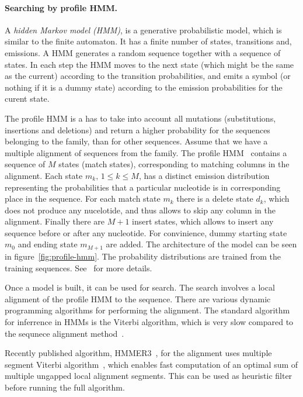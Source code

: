 \paragraph{Searching by profile HMM.}
A \emph{hidden Markov model (HMM)}, is a generative probabilistic model, which is similar to the finite automaton. It has a finite number of states, transitions and, emissions. A HMM generates a random sequence together with a sequence of states. In each step the HMM moves to the next state (which might be the same as the current) according to the transition probabilities, and emits a symbol (or nothing if it is a dummy state) according to the emission probabilities for the curent state.

The profile HMM is a\todo{} has to take into account all mutations (substitutions, insertions and deletions) and return a higher probability for the sequences belonging to the family, than for other sequences.
Assume that we have a multiple alignment of sequences from the family. The profile HMM~\cite{profile-hmm} contains a sequence of $M$ states (match states), corresponding to matching columns in the alignment. Each state $m_k,\, 1 \leq k \leq M$, has a distinct emission distribution representing the probabilities that a particular nucleotide is in corresponding place in the sequence.
For each match state $m_k$ there is a delete state $d_k$, which does not produce any nucelotide, and thus allows to skip any column in the alignment. Finally there are $M+1$ insert states, which allows to insert any sequence before or after any nucleotide. For convinience, dummy starting state $m_0$ and ending state $m_{M+1}$ are added.
The architecture of the model can be seen in figure~\ref{fig:profile-hmm}. The probability distributions are trained from the training sequences. See~\cite{profile-hmm} for more details.

Once a model is built, it can be used for search. The search involves a local alignment of the profile HMM to the sequence.
There are various dynamic programming algorithms for performing the alignment. The standard algorithm for inferrence in HMMs is the Viterbi algorithm, which is very slow compared to the sequnece alignment method~\cite{eddy2011accelerated}.
\begin{reformulate}
Recently published algorithm, HMMER3~\cite{eddy2011accelerated}, for the alignment uses multiple segment Viterbi algorithm~\cite{eddy2011accelerated}, which enables fast computation of an optimal sum of multiple ungapped local
alignment segments. This can be used as heuristic filter before running the full algorithm.
\end{reformulate}

